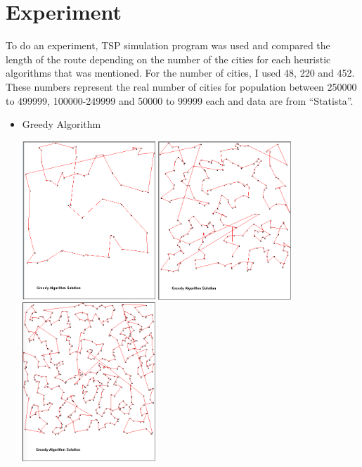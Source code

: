 \documentclass[12pt]{article}
\begin{document}
\section{Experiment}
To do an experiment, TSP simulation program\cite{TSPProgram} was used and compared the length of the route depending on the number of the cities for each heuristic algorithms that was mentioned. For the number of cities, I used 48, 220 and 452. These numbers represent the real number of cities for population between 250000 to 499999, 100000-249999 and 50000 to 99999 each and data are from \enquote{Statista}.\cite{statista} 
\begin{itemize}
\item Greedy Algorithm
		\begin{center}
			\includegraphics[width=5cm]{Greedy48.png}
            \includegraphics[width=5cm]{Greedy220.PNG}
            \includegraphics[width=5cm]{Greedy452.png}
		\end{center}


\end{itemize}
\end{document}
